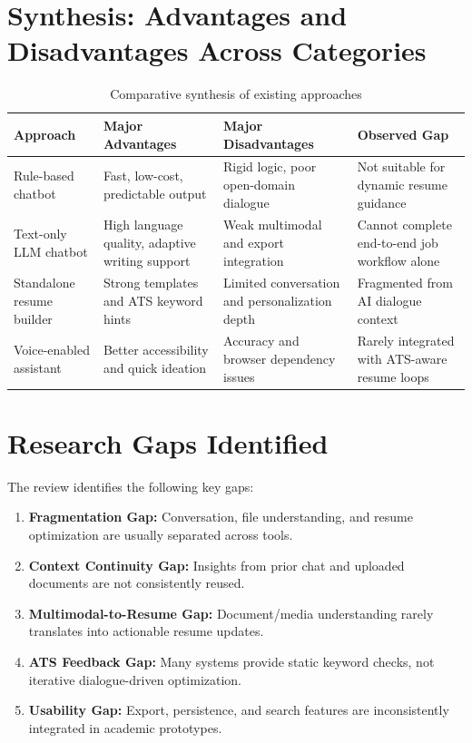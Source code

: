 \documentclass[conference]{IEEEtran}
\begin{document}
\section{Synthesis: Advantages and Disadvantages Across Categories}
\begin{table}[ht]
\centering
\caption{Comparative synthesis of existing approaches}
\begin{tabular}{|p{3.4cm}|p{4.0cm}|p{4.0cm}|p{4.3cm}|}
\hline
\textbf{Approach} & \textbf{Major Advantages} & \textbf{Major Disadvantages} & \textbf{Observed Gap} \\
\hline
Rule-based chatbot & Fast, low-cost, predictable output & Rigid logic, poor open-domain dialogue & Not suitable for dynamic resume guidance \\
\hline
Text-only LLM chatbot & High language quality, adaptive writing support & Weak multimodal and export integration & Cannot complete end-to-end job workflow alone \\
\hline
Standalone resume builder & Strong templates and ATS keyword hints & Limited conversation and personalization depth & Fragmented from AI dialogue context \\
\hline
Voice-enabled assistant & Better accessibility and quick ideation & Accuracy and browser dependency issues & Rarely integrated with ATS-aware resume loops \\
\hline
\end{tabular}
\end{table}

\section{Research Gaps Identified}
The review identifies the following key gaps:
\begin{enumerate}
    \item \textbf{Fragmentation Gap:} Conversation, file understanding, and resume optimization are usually separated across tools.
    \item \textbf{Context Continuity Gap:} Insights from prior chat and uploaded documents are not consistently reused.
    \item \textbf{Multimodal-to-Resume Gap:} Document/media understanding rarely translates into actionable resume updates.
    \item \textbf{ATS Feedback Gap:} Many systems provide static keyword checks, not iterative dialogue-driven optimization.
    \item \textbf{Usability Gap:} Export, persistence, and search features are inconsistently integrated in academic prototypes.
\end{enumerate}
\end{document}
